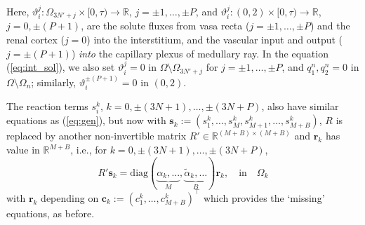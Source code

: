 \documentclass{article}
\begin{document}
Here, $\vartheta_i^j:\Omega_{3N'+j}\times [0,\tau)\to \mathbb{R}$, $j=\pm 1,\dots,\pm P$, and $\vartheta_i^j:(0,2)\times [0,\tau)\to \mathbb{R}$, $j=0,\pm(P+1)$, are the solute fluxes from vasa recta ($j=\pm 1,\dots,\pm P$) and the renal cortex ($j=0$) into the interstitium, and the vascular input and output ($j=\pm(P+1)$) \textit{into} the capillary plexus of medullary ray.
In the equation (\ref{eq:int_sol}), we also set $\vartheta_i^j=0$ in $\Omega\setminus \Omega_{3N'+j}$ for $j=\pm 1,\dots,\pm P$, and $q_1^n,q_2^n=0$ in $\Omega\setminus\Omega_n$; similarly, $\vartheta_i^{\pm(P+1)} = 0$ in $(0,2)$.

The reaction terms $s_i^k$, $k=0,\pm(3N+1),\dots,\pm(3N+P)$, also have similar equations as (\ref{eq:gen}), but now with $\mathbf{s}_k:=(s_1^k,\dots,s_M^k,s_{M+1}^k,\dots,s_{M+B}^k)$, $R$ is replaced by another non-invertible matrix $R'\in \mathbb{R}^{(M+B)\times (M+B)}$ and $\mathbf{r}_k$ has value in $\mathbb{R}^{M+B}$, i.e., for $k=0,\pm(3N+1),\dots,\pm(3N+P)$,
\begin{equation}
    R'\mathbf{s}_k=\mathrm{diag}(\underbrace{\alpha_k,...}_{M},\underbrace{\tilde{\alpha}_k,\dots}_B)\mathbf{r}_k,\quad \text{in}\quad \Omega_k
\end{equation}
with $\mathbf{r}_k$ depending on $\mathbf{c}_k:=(c_1^k,\dots,c_{M+B}^k)^\top$ which provides the `missing' equations, as before.
\end{document}
